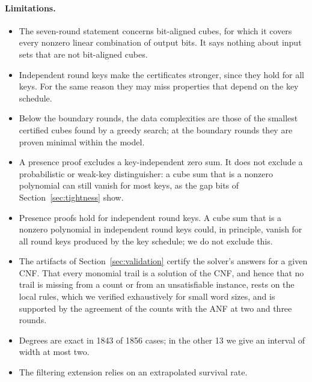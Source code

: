 \documentclass[pdflatex,sn-mathphys-num]{sn-jnl}
\theoremstyle{thmstyleone}
\theoremstyle{thmstylethree}
\theoremstyle{thmstyletwo}
\begin{document}
\paragraph{Limitations.}
\begin{itemize}
\item The seven-round statement concerns bit-aligned cubes, for which it covers every nonzero linear combination of output bits. It says nothing about input sets that are not bit-aligned cubes.
\item Independent round keys make the certificates stronger, since they hold for all keys. For the same reason they may miss properties that depend on the key schedule.
\item Below the boundary rounds, the data complexities are those of the smallest certified cubes found by a greedy search; at the boundary rounds they are proven minimal within the model.
\item A presence proof excludes a key-independent zero sum. It does not exclude a probabilistic or weak-key distinguisher: a cube sum that is a nonzero polynomial can still vanish for most keys, as the gap bits of Section~\ref{sec:tightness} show.
\item Presence proofs hold for independent round keys. A cube sum that is a nonzero polynomial in independent round keys could, in principle, vanish for all round keys produced by the key schedule; we do not exclude this.
\item The artifacts of Section~\ref{sec:validation} certify the solver's answers for a given CNF. That every monomial trail is a solution of the CNF, and hence that no trail is missing from a count or from an unsatisfiable instance, rests on the local rules, which we verified exhaustively for small word sizes, and is supported by the agreement of the counts with the ANF at two and three rounds.
\item Degrees are exact in 1843 of 1856 cases; in the other 13 we give an interval of width at most two.
\item The filtering extension relies on an extrapolated survival rate.
\end{itemize}

\end{document}
